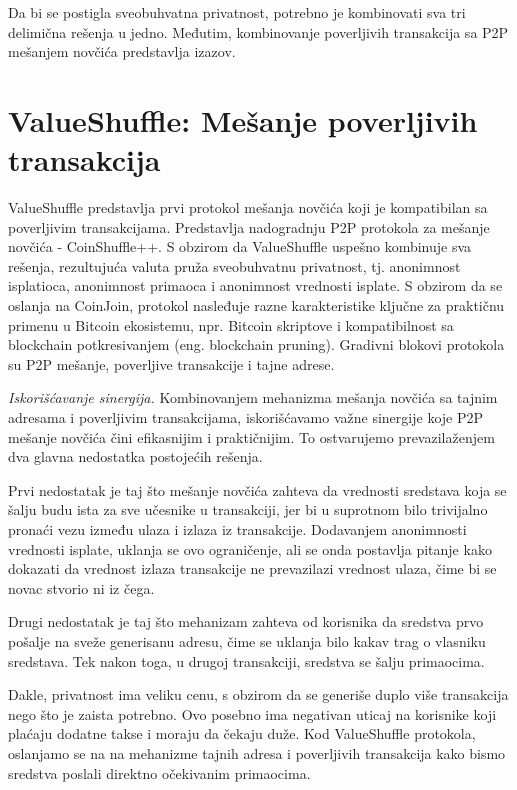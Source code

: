 \documentclass[a4paper]{article}
\begin{document}
Da bi se postigla sveobuhvatna privatnost, potrebno je kombinovati sva tri delimična rešenja u jedno. Međutim, kombinovanje poverljivih transakcija sa P2P mešanjem novčića predstavlja izazov.
		
\section{ValueShuffle: Mešanje poverljivih transakcija}
ValueShuffle predstavlja prvi protokol mešanja novčića koji je kompatibilan sa poverljivim transakcijama. Predstavlja nadogradnju P2P protokola za mešanje novčića - CoinShuffle++. S obzirom da ValueShuffle uspešno kombinuje sva rešenja, rezultujuća valuta pruža sveobuhvatnu privatnost, tj. anonimnost isplatioca, anonimnost primaoca i anonimnost vrednosti isplate. S obzirom da se oslanja na CoinJoin, protokol nasleđuje razne karakteristike ključne za praktičnu primenu u Bitcoin ekosistemu, npr. Bitcoin skriptove i kompatibilnost sa blockchain potkresivanjem (eng. blockchain pruning). Gradivni blokovi protokola su P2P mešanje, poverljive transakcije i tajne adrese.
			
\textit{Iskorišćavanje sinergija.} Kombinovanjem mehanizma mešanja novčića sa tajnim adresama i poverljivim transakcijama, iskorišćavamo važne sinergije koje P2P mešanje novčića čini efikasnijim i praktičnijim. To ostvarujemo prevazilaženjem dva glavna nedostatka postojećih rešenja.

Prvi nedostatak je taj što mešanje novčića zahteva da vrednosti sredstava koja se šalju budu ista za sve učesnike u transakciji, jer bi u suprotnom bilo trivijalno pronaći vezu između ulaza i izlaza iz transakcije. Dodavanjem anonimnosti vrednosti isplate, uklanja se ovo ograničenje, ali se onda postavlja pitanje kako dokazati da vrednost izlaza transakcije ne prevazilazi vrednost ulaza, čime bi se novac stvorio ni iz čega.

Drugi nedostatak je taj što mehanizam zahteva od korisnika da sredstva prvo pošalje na sveže generisanu adresu, čime se uklanja bilo kakav trag o vlasniku sredstava. Tek nakon toga, u drugoj transakciji, sredstva se šalju primaocima.

Dakle, privatnost ima veliku cenu, s obzirom da se generiše duplo više transakcija nego što je zaista potrebno. Ovo posebno ima negativan uticaj na korisnike koji plaćaju dodatne takse i moraju da čekaju duže. Kod ValueShuffle protokola, oslanjamo se na na mehanizme tajnih adresa i poverljivih transakcija kako bismo sredstva poslali direktno očekivanim primaocima.
\end{document}
